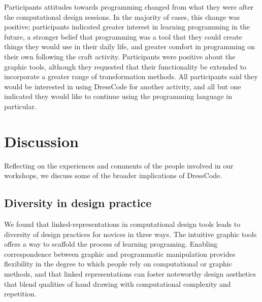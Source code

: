 \documentclass{sigchi}
\begin{document}
Participants attitudes towards programming changed from what they were after the computational design sessions. In the majority of cases, this change was positive; participants indicated greater interest in learning programming in the future, a stronger belief that programming was a tool that they could create things they would use in their daily life, and greater comfort in programming on their own following the craft activity. Participants were positive about the graphic tools, although they requested that their functionality be extended to incorporate a greater range of transformation methods. All participants said they would be interested in using DressCode for another activity, and all but one indicated they would like to continue using the programming language in particular.

\section{Discussion}
Reflecting on the experiences and comments of the people involved in our workshops, we discuss some of the broader implications of DressCode.

\subsection{Diversity in design practice}
We found that linked-representations in computational design tools leads to diversity of design practices for novices in three ways. The intuitive graphic tools offers a way to scaffold the process of learning programing. Enabling correspondence between graphic and programmatic manipulation provides flexibility in the degree to which people rely on computational or graphic methods, and that linked representations can foster noteworthy design aesthetics that blend qualities of hand drawing with computational complexity and repetition.
\end{document}
